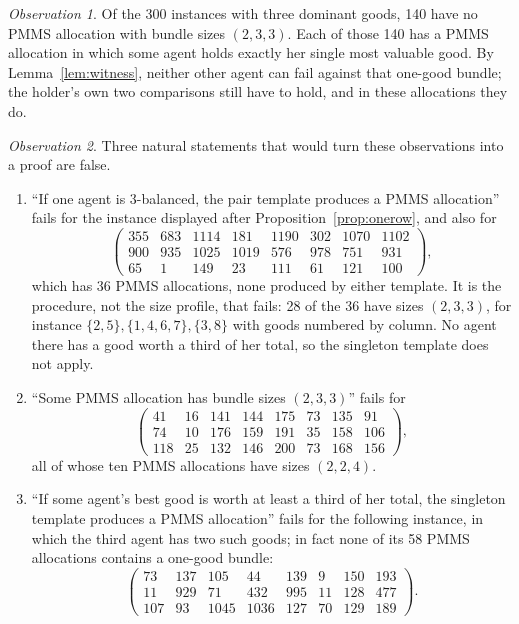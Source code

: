 \documentclass[11pt,a4paper]{article}
\theoremstyle{remark}
\newtheorem{observation}{Observation}
\begin{document}
\begin{observation}
Of the 300 instances with three dominant goods, 140 have no PMMS allocation with bundle sizes $(2,3,3)$. Each of those 140 has a PMMS allocation in which some agent holds exactly her single most valuable good. By Lemma~\ref{lem:witness}, neither other agent can fail against that one-good bundle; the holder's own two comparisons still have to hold, and in these allocations they do.
\end{observation}

\begin{observation}
Three natural statements that would turn these observations into a proof are false.
\begin{enumerate}[label=(\alph*)]
\item ``If one agent is $3$-balanced, the pair template produces a PMMS allocation'' fails for the instance displayed after Proposition~\ref{prop:onerow}, and also for
\[\begin{pmatrix}355&683&1114&181&1190&302&1070&1102\\900&935&1025&1019&576&978&751&931\\65&1&149&23&111&61&121&100\end{pmatrix},\]
which has 36 PMMS allocations, none produced by either template. It is the procedure, not the size profile, that fails: 28 of the 36 have sizes $(2,3,3)$, for instance $\{2,5\},\{1,4,6,7\},\{3,8\}$ with goods numbered by column. No agent there has a good worth a third of her total, so the singleton template does not apply.
\item ``Some PMMS allocation has bundle sizes $(2,3,3)$'' fails for
\[\begin{pmatrix}41&16&141&144&175&73&135&91\\74&10&176&159&191&35&158&106\\118&25&132&146&200&73&168&156\end{pmatrix},\]
all of whose ten PMMS allocations have sizes $(2,2,4)$.
\item ``If some agent's best good is worth at least a third of her total, the singleton template produces a PMMS allocation'' fails for the following instance, in which the third agent has two such goods; in fact none of its 58 PMMS allocations contains a one-good bundle:
\[\begin{pmatrix}73&137&105&44&139&9&150&193\\11&929&71&432&995&11&128&477\\107&93&1045&1036&127&70&129&189\end{pmatrix}.\]
\end{enumerate}
\end{observation}
\end{document}
